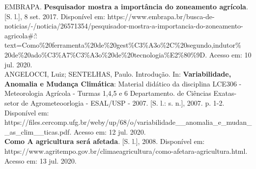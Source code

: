 \documentclass[a4paper, 12pt]{article}
\begin{document}
	\noindent EMBRAPA. \textbf{Pesquisador mostra a importância do zoneamento agrícola}. [S. l.], 8 set. 2017. Disponível em: https://www.embrapa.br/busca-de-noticias/-/notic\newline ia/26571354/pesquisador-mostra-a-importancia-do-zoneamento-agricola\#:\~: text=\newline Como\%20ferramenta\%20de\%20gest\%C3\%A3o\%2C\%20segundo,indutor\% 20de\newline\%20ado\%C3\%A7\%C3\%A3o\%20de\%20tecnologia\%E2\%80\%9D. \newline Acesso em: 10 jul. 2020.\\
	
	\noindent ANGELOCCI, Luiz; SENTELHAS, Paulo. Introdução. In: \textbf{Variabilidade, Anomalia e Mudança Climática}: Material didático da disciplina LCE306 -Meteorologia Agrícola - Turmas 1,4,5 e 6  Departamento. de Ciências Exatas- setor de Agrometeoorlogia - ESAL/USP - 2007. [S. l.: s. n.], 2007. p. 1-2. Disponível em: https://files.cercomp.ufg.br/weby/up/68/o/variabilidade\_\_anomalia\_e\_mudan\_\_as\_clim\_\_\-ticas.pdf. Acesso em: 12 jul. 2020.\\
	
	\noindent \textbf{Como A agricultura será afetada}. [S. l.], 2008. Disponível em: https://www.agritempo.gov.br/climaeagricultura/como-afetara-agricultura.html. Acesso em: 13 jul. 2020.
	
\end{document}
